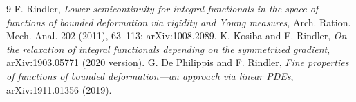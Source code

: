 \documentclass[11pt]{article}
\begin{document}
\begin{thebibliography}{9}
 F. Rindler,
\emph{Lower semicontinuity for integral functionals in the space of functions
of bounded deformation via rigidity and Young measures},
Arch. Ration. Mech. Anal. 202 (2011), 63--113; arXiv:1008.2089.
 K. Kosiba and F. Rindler,
\emph{On the relaxation of integral functionals depending on the symmetrized
gradient}, arXiv:1903.05771 (2020 version).
 G. De Philippis and F. Rindler,
\emph{Fine properties of functions of bounded deformation---an approach via
linear PDEs}, arXiv:1911.01356 (2019).
\end{thebibliography}
\end{document}
